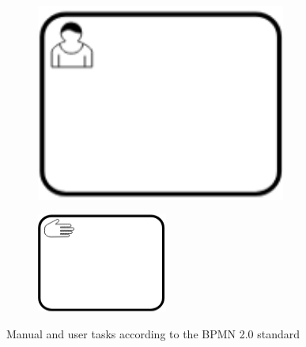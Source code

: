 \begin{figure}[h]
	\centering
	\begin{subfigure}[b]{0.18\columnwidth}
		\centering
		\includegraphics[width=0.9\textwidth]{graphics/user-task}
		\label{fig:usertask}
	\end{subfigure}
	\begin{subfigure}[b]{0.18\columnwidth}
		\centering
		\includegraphics[width=0.9\columnwidth]{graphics/manual-task}
		\label{fig:manualtask}
	\end{subfigure}
	\caption{Manual and user tasks according to the BPMN 2.0 standard \cite{bpmnstandard}} %
	\label{fig:nonautomatedtasks} %
\end{figure}

